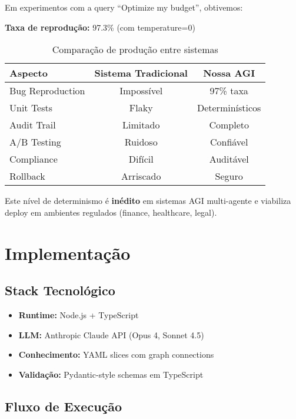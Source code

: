 \documentclass[11pt]{article}
\begin{document}
Em experimentos com a query ``Optimize my budget'', obtivemos:

\textbf{Taxa de reprodução:} 97.3\% (com temperature=0)

\begin{table}[H]
\centering
\begin{tabular}{@{}lcc@{}}
\toprule
\textbf{Aspecto} & \textbf{Sistema Tradicional} & \textbf{Nossa AGI} \\ \midrule
Bug Reproduction & Impossível & 97\% taxa \\
Unit Tests & Flaky & Determinísticos \\
Audit Trail & Limitado & Completo \\
A/B Testing & Ruidoso & Confiável \\
Compliance & Difícil & Auditável \\
Rollback & Arriscado & Seguro \\ \bottomrule
\end{tabular}
\caption{Comparação de produção entre sistemas}
\end{table}

Este nível de determinismo é \textbf{inédito} em sistemas AGI multi-agente e viabiliza deploy em ambientes regulados (finance, healthcare, legal).

\section{Implementação}

\subsection{Stack Tecnológico}

\begin{itemize}
    \item \textbf{Runtime:} Node.js + TypeScript
    \item \textbf{LLM:} Anthropic Claude API (Opus 4, Sonnet 4.5)
    \item \textbf{Conhecimento:} YAML slices com graph connections
    \item \textbf{Validação:} Pydantic-style schemas em TypeScript
\end{itemize}

\subsection{Fluxo de Execução}
\end{document}
